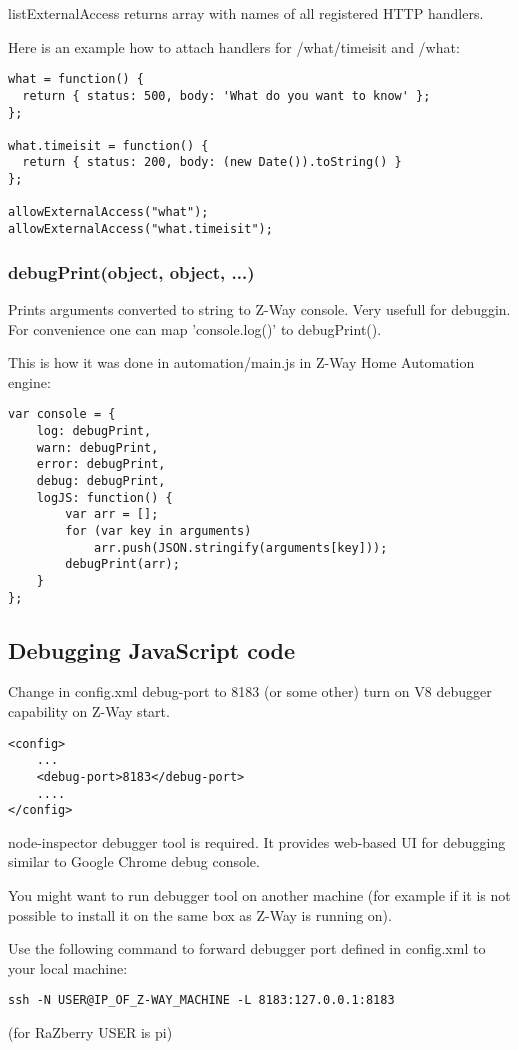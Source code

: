 listExternalAccess returns array with names of all registered HTTP handlers.

Here is an example how to attach handlers for /what/timeisit and /what:

\begin{lstlisting}
what = function() {
  return { status: 500, body: 'What do you want to know' };
};

what.timeisit = function() {
  return { status: 200, body: (new Date()).toString() }
};

allowExternalAccess("what");
allowExternalAccess("what.timeisit");
\end{lstlisting}

\subsubsection{debugPrint(object, object, ...)}

Prints arguments converted to string to Z-Way console. Very usefull for debuggin.
For convenience one can map 'console.log()' to debugPrint().

This is how it was done in automation/main.js in Z-Way Home Automation engine:
\begin{lstlisting}
var console = {
    log: debugPrint,
    warn: debugPrint,
    error: debugPrint,
    debug: debugPrint,
    logJS: function() {
        var arr = [];
        for (var key in arguments)
            arr.push(JSON.stringify(arguments[key]));
        debugPrint(arr);
    }
};
\end{lstlisting}

\subsection{Debugging JavaScript code}
Change in config.xml debug-port to 8183 (or some other) turn on V8 debugger capability on Z-Way start.

\begin{lstlisting}
<config>
    ...
    <debug-port>8183</debug-port>
    ....
</config>
\end{lstlisting}

node-inspector debugger tool is required. It provides web-based UI for debugging similar to Google Chrome debug console.

You might want to run debugger tool on another machine (for example if it is not possible to install it on the same box as Z-Way is running on).

Use the following command to forward debugger port defined in config.xml to your local machine:
\begin{lstlisting}
ssh -N USER@IP_OF_Z-WAY_MACHINE -L 8183:127.0.0.1:8183
\end{lstlisting}
(for RaZberry USER is pi)

